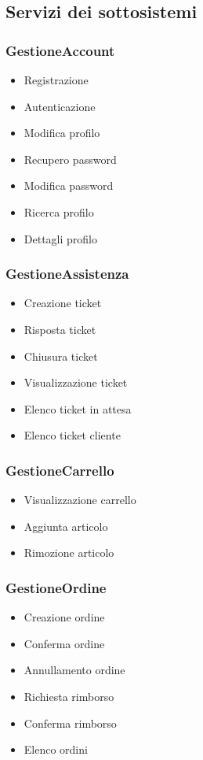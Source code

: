 \documentclass[12pt,a4paper]{article}
\begin{document}
\newpage

\subsection{Servizi dei sottosistemi}
\subsubsection{GestioneAccount}
\begin{itemize}
\item Registrazione
\item Autenticazione
\item Modifica profilo
\item Recupero password
\item Modifica password
\item Ricerca profilo
\item Dettagli profilo
\end{itemize}

\subsubsection{GestioneAssistenza}
\begin{itemize}
\item Creazione ticket
\item Risposta ticket
\item Chiusura ticket
\item Visualizzazione ticket
\item Elenco ticket in attesa
\item Elenco ticket cliente
\end{itemize}

\subsubsection{GestioneCarrello}
\begin{itemize}
\item Visualizzazione carrello
\item Aggiunta articolo
\item Rimozione articolo
\end{itemize}

\subsubsection{GestioneOrdine}
\begin{itemize}
\item Creazione ordine
\item Conferma ordine
\item Annullamento ordine
\item Richiesta rimborso
\item Conferma rimborso
\item Elenco ordini
\end{itemize}
\end{document}

